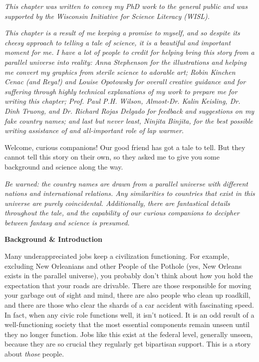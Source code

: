 {
\setlength{\parindent}{0pt}
\setlength{\parskip}{1em}

\begin{quoting}
  {
  \footnotesize
  \textit{This chapter was written to convey my PhD work to the general public
  and was supported by the Wisconsin Initiative for Science Literacy (WISL).}
  
  \textit{This chapter is a result of me keeping a promise to myself, and so
  despite its cheesy approach to telling a tale of science, it is a beautiful
  and important moment for me. I have a lot of people to credit for helping
  bring this story from a parallel universe into reality: Anna Stephenson for
  the illustrations and helping me convert my graphics from sterile science to
  adorable art; Robin Kinchen Cenac (and Reya!) and Louise Opotowsky for
  overall creative guidance and for suffering through highly technical
  explanations of my work to prepare me for writing this chapter; Prof. Paul
  P.H. Wilson, Almost-Dr.  Kalin Keisling, Dr. Dinh Truong, and Dr. Richard
  Rojas Delgado for feedback and suggestions on my fake country names; and last
  but never least, Ninjita Binjita, for the best possible writing assistance of
  and all-important role of lap warmer.} 
 
  }
\end{quoting}

\narr Welcome, curious companions! Our good friend has got a tale to tell.  But
they cannot tell this story on their own, so they asked me to give you some
background and science along the way.

\textit{Be warned: the country names are drawn from a parallel universe with
different nations and international relations. Any similarities to countries
that exist in this universe are purely coincidental. Additionally, there are
fantastical details throughout the tale, and the capability of our curious
companions to decipher between fantasy and science is presumed.}

\begin{tcolorbox}[halign=center]
\textbf{Background \& Introduction}
\end{tcolorbox}

Many underappreciated jobs keep a civilization functioning. For example,
excluding New Orleanians and other People of the Pothole (yes, New Orleans
exists in the parallel universe), you probably don't think about how you hold
the expectation that your roads are drivable. There are those responsible for
moving your garbage out of sight and mind, there are also people who clean up
roadkill, and there are those who clear the shards of a car accident with
fascinating speed. In fact, when any civic role functions well, it isn't
noticed. It is an odd result of a well-functioning society that the most
essential components remain unseen until they no longer function. Jobs like
this exist at the federal level, generally unseen, because they are so crucial
they regularly get bipartisan support. This is a story about \textit{those}
people.

}
